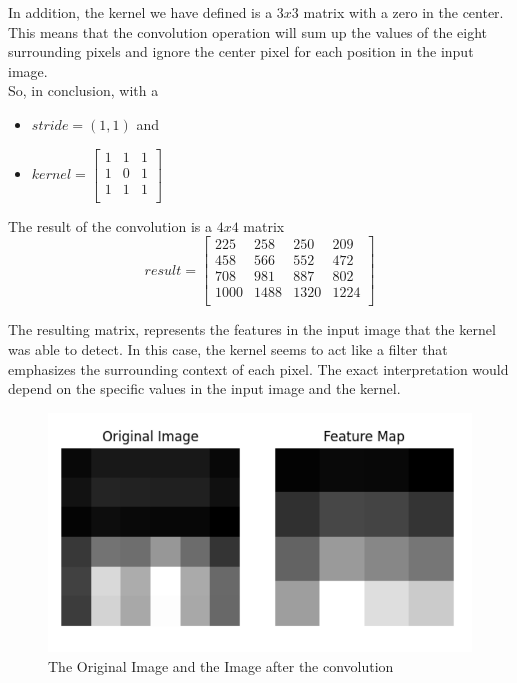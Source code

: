 In addition, the kernel we have defined is a $3 x 3$ matrix with a zero in the center. This means that the convolution operation will sum up the values of the eight surrounding pixels and ignore the center pixel for each position in the input image.\\

So, in conclusion, with a
\begin{itemize}
	\item $stride = \left(1,1\right)$ and 
	\item $	kernel = \begin{bmatrix}
		1 & 1 & 1  \\
		1 & 0 & 1  \\
		1 & 1 & 1  \\
	\end{bmatrix}$
\end{itemize}

The result of the convolution is a $ 4 x 4$ matrix\\

\begin{equation}
	result = \begin{bmatrix}
		225 & 258 & 250 & 209  \\
		458 & 566 & 552 & 472  \\
		708 & 981 & 887 & 802  \\
		1000 & 1488 & 1320 &1224 \\
	\end{bmatrix}
\end{equation}
\vspace{6mm}

The resulting matrix, represents the features in the input image that the kernel was able to detect. In this case, the kernel seems to act like a filter that emphasizes the surrounding context of each pixel. The exact interpretation would depend on the specific values in the input image and the kernel. 

\begin{figure}[h]
	\centering
	\includegraphics[width=.7\textwidth]{../Problem 11/conv_result.pdf}
	\caption{The Original Image and the Image after the convolution}
\end{figure}
\vspace{3mm}
